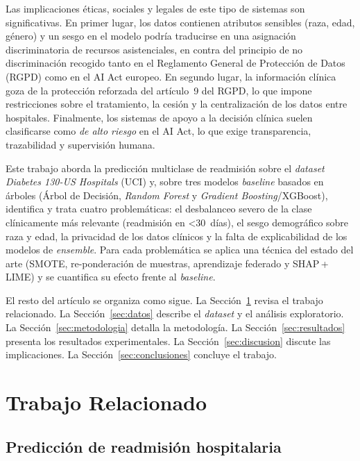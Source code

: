 \documentclass[11pt,a4paper]{article}
\begin{document}
Las implicaciones éticas, sociales y legales de este tipo de sistemas son significativas. En primer lugar, los datos contienen atributos sensibles (raza, edad, género) y un sesgo en el modelo podría traducirse en una asignación discriminatoria de recursos asistenciales, en contra del principio de no discriminación recogido tanto en el Reglamento General de Protección de Datos (RGPD) como en el AI Act europeo. En segundo lugar, la información clínica goza de la protección reforzada del artículo~9 del RGPD, lo que impone restricciones sobre el tratamiento, la cesión y la centralización de los datos entre hospitales. Finalmente, los sistemas de apoyo a la decisión clínica suelen clasificarse como \textit{de alto riesgo} en el AI Act, lo que exige transparencia, trazabilidad y supervisión humana.

Este trabajo aborda la predicción multiclase de readmisión sobre el \textit{dataset} \textit{Diabetes 130-US Hospitals} (UCI) y, sobre tres modelos \textit{baseline} basados en árboles (Árbol de Decisión, \textit{Random Forest} y \textit{Gradient Boosting}/XGBoost), identifica y trata cuatro problemáticas: el desbalanceo severo de la clase clínicamente más relevante (readmisión en <30~días), el sesgo demográfico sobre raza y edad, la privacidad de los datos clínicos y la falta de explicabilidad de los modelos de \textit{ensemble}. Para cada problemática se aplica una técnica del estado del arte (SMOTE, re-ponderación de muestras, aprendizaje federado y SHAP\,+\,LIME) y se cuantifica su efecto frente al \textit{baseline}.

El resto del artículo se organiza como sigue.
La Sección~\ref{sec:related} revisa el trabajo relacionado.
La Sección~\ref{sec:datos} describe el \textit{dataset} y el análisis exploratorio.
La Sección~\ref{sec:metodologia} detalla la metodología.
La Sección~\ref{sec:resultados} presenta los resultados experimentales.
La Sección~\ref{sec:discusion} discute las implicaciones.
La Sección~\ref{sec:conclusiones} concluye el trabajo.


\section{Trabajo Relacionado}
\label{sec:related}

\subsection{Predicción de readmisión hospitalaria}
\end{document}
